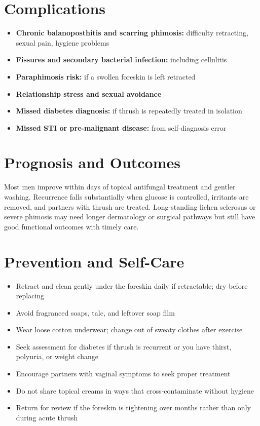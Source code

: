 \section*{Complications}
\begin{itemize}
    \item \textbf{Chronic balanoposthitis and scarring phimosis:} difficulty retracting, sexual pain, hygiene problems
    \item \textbf{Fissures and secondary bacterial infection:} including cellulitis
    \item \textbf{Paraphimosis risk:} if a swollen foreskin is left retracted
    \item \textbf{Relationship stress and sexual avoidance}
    \item \textbf{Missed diabetes diagnosis:} if thrush is repeatedly treated in isolation
    \item \textbf{Missed STI or pre-malignant disease:} from self-diagnosis error
\end{itemize}

\section*{Prognosis and Outcomes}
Most men improve within days of topical antifungal treatment and gentler washing. Recurrence falls substantially when glucose is controlled, irritants are removed, and partners with thrush are treated. Long-standing lichen sclerosus or severe phimosis may need longer dermatology or surgical pathways but still have good functional outcomes with timely care.

\section*{Prevention and Self-Care}
\begin{itemize}
    \item Retract and clean gently under the foreskin daily if retractable; dry before replacing
    \item Avoid fragranced soaps, talc, and leftover soap film
    \item Wear loose cotton underwear; change out of sweaty clothes after exercise
    \item Seek assessment for diabetes if thrush is recurrent or you have thirst, polyuria, or weight change
    \item Encourage partners with vaginal symptoms to seek proper treatment
    \item Do not share topical creams in ways that cross-contaminate without hygiene
    \item Return for review if the foreskin is tightening over months rather than only during acute thrush
\end{itemize}

